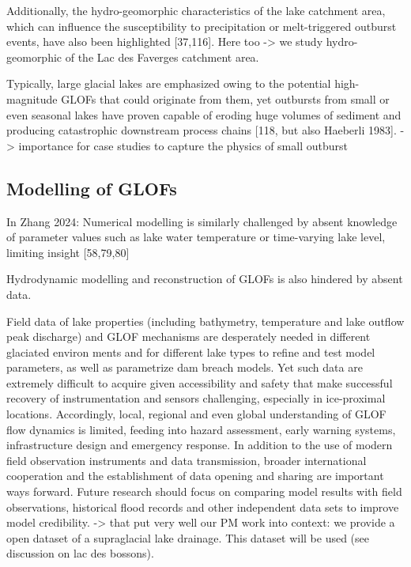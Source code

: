 Additionally, the hydro-geomorphic characteristics of the lake catchment area, which can influence the susceptibility to precipitation or melt-triggered outburst events, have also been highlighted [37,116]. Here too -> we study hydro-geomorphic of the Lac des Faverges catchment area. 




Typically, large glacial lakes are emphasized owing to the potential
high-magnitude GLOFs that could originate from them, yet outbursts
from small or even seasonal lakes have proven capable of eroding huge
volumes of sediment and producing catastrophic downstream process
chains [118, but also Haeberli 1983]. -> importance for case studies to capture the physics of small outburst



\subsection{Modelling of GLOFs}%

In Zhang 2024: Numerical modelling is similarly challenged by absent knowledge of parameter values such as lake water temperature or time-varying lake level, limiting insight [58,79,80]

Hydrodynamic modelling and reconstruction of GLOFs is also hindered by absent data. 

Field data of lake properties (including bathymetry, temperature and lake outflow peak discharge) and GLOF mechanisms are desperately needed in different glaciated environ ments and for different lake types to refine and test model parameters, as well as parametrize dam breach models. Yet such data are extremely difficult to acquire given accessibility and safety that make successful recovery of instrumentation and sensors challenging, especially in ice-proximal locations. Accordingly, local, regional and even global understanding of GLOF flow dynamics is limited, feeding into hazard assessment, early warning systems, infrastructure design and emergency response. 
In addition to the use of modern field observation instruments and data transmission, broader international cooperation and the establishment of data opening and sharing are important ways forward. Future research should focus on comparing model results with field observations, historical flood records and other independent data sets to improve model credibility. -> that put very well our PM work into context: we provide a open dataset of a supraglacial lake drainage. This dataset will be used (see discussion on lac des bossons).


